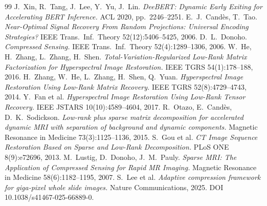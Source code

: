 \documentclass[11pt]{article}
\begin{document}
\begin{thebibliography}{99}
 J.~Xin, R.~Tang, J.~Lee, Y.~Yu, J.~Lin. \emph{DeeBERT: Dynamic Early Exiting for Accelerating BERT Inference.} ACL 2020, pp.~2246--2251.
 E.~J.~Cand\`es, T.~Tao. \emph{Near-Optimal Signal Recovery From Random Projections: Universal Encoding Strategies?} IEEE Trans.~Inf.~Theory 52(12):5406--5425, 2006.
 D.~L.~Donoho. \emph{Compressed Sensing.} IEEE Trans.~Inf.~Theory 52(4):1289--1306, 2006.
 W.~He, H.~Zhang, L.~Zhang, H.~Shen. \emph{Total-Variation-Regularized Low-Rank Matrix Factorization for Hyperspectral Image Restoration.} IEEE TGRS 54(1):178--188, 2016.
 H.~Zhang, W.~He, L.~Zhang, H.~Shen, Q.~Yuan. \emph{Hyperspectral Image Restoration Using Low-Rank Matrix Recovery.} IEEE TGRS 52(8):4729--4743, 2014.
 Y.~Fan et al. \emph{Hyperspectral Image Restoration Using Low-Rank Tensor Recovery.} IEEE JSTARS 10(10):4589--4604, 2017.
 R.~Otazo, E.~Cand\`es, D.~K.~Sodickson. \emph{Low-rank plus sparse matrix decomposition for accelerated dynamic MRI with separation of background and dynamic components.} Magnetic Resonance in Medicine 73(3):1125--1136, 2015.
 S.~Gou et al. \emph{CT Image Sequence Restoration Based on Sparse and Low-Rank Decomposition.} PLoS ONE 8(9):e72696, 2013.
 M.~Lustig, D.~Donoho, J.~M.~Pauly. \emph{Sparse MRI: The Application of Compressed Sensing for Rapid MR Imaging.} Magnetic Resonance in Medicine 58(6):1182--1195, 2007.
 S.~Lee et al. \emph{Adaptive compression framework for giga-pixel whole slide images.} Nature Communications, 2025. DOI 10.1038/s41467-025-66889-0.
\end{thebibliography}
\end{document}
